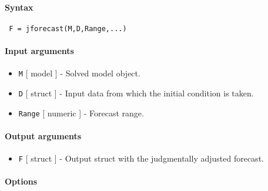 


	\paragraph{Syntax}
 
 \begin{verbatim}
 F = jforecast(M,D,Range,...)
 \end{verbatim}
 
 \paragraph{Input arguments}
 
 \begin{itemize}
 \item
   \texttt{M} {[} model {]} - Solved model object.
 \item
   \texttt{D} {[} struct {]} - Input data from which the initial
   condition is taken.
 \item
   \texttt{Range} {[} numeric {]} - Forecast range.
 \end{itemize}
 
 \paragraph{Output arguments}
 
 \begin{itemize}
 \item
   \texttt{F} {[} struct {]} - Output struct with the judgmentally
   adjusted forecast.
 \end{itemize}
 
 \paragraph{Options}
 
